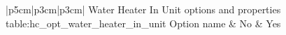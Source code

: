 \begin{customLongTable}{ |p{5cm}|p{3cm}|p{3cm}| }
{Water Heater In Unit options and properties} {table:hc_opt_water_heater_in_unit}
{Option name & No & Yes}
\endhead
\hline
\end{customLongTable}
